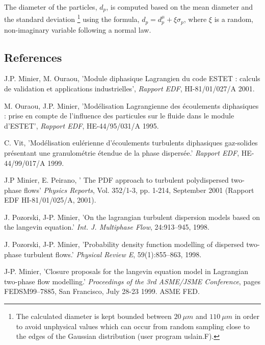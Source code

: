 \documentclass[a4paper,twoside,12pt]{article}
\begin{document}
\begin{itemize}
         \noindent
         The diameter of the particles, $d_p$, is computed based on the mean diameter and the standard deviation \footnote{The calculated diameter is kept bounded between  $20~\mu m$ and $110~\mu m$ in order to avoid unphysical values which can occur from random sampling close to the edges of the Gaussian distribution
            (user program uslain.F).} using the formula, $d_p = d_p^\mu + \xi \sigma_{p}$, where $\xi$ is a random, non-imaginary variable following a normal law.

\end{itemize}

\subsection{References}

\begin{thebibliography}{3}


    J.P. Minier, M. Ouraou, 'Module diphasique Lagrangien
   du code ESTET : calculs de validation et applications industrielles',
   {\it Rapport EDF}, HI-81/01/027/A 2001.

    M. Ouraou, J.P. Minier, 'Mod\'elisation Lagrangienne des
   \'ecoulements diphasiques : prise en compte de l'influence des particules
   sur le fluide dans le module d'ESTET',
   {\it Rapport EDF}, HE-44/95/031/A 1995.

     C. Vit, 'Mod\'elisation eul\'erienne d'\'ecoulements
   turbulents diphasiques gaz-solides pr\'esentant une granulom\'etrie
   \'etendue de la phase dispers\'ee.'
   {\it Rapport EDF}, HE-44/99/017/A 1999.

    J.P Minier, E. Peirano,
   ' The PDF approach to turbulent polydispersed two-phase flows'
   {\it Physics Reports}, Vol. 352/1-3, pp. 1-214, September 2001
   (Rapport EDF HI-81/01/025/A, 2001).

    J. Pozorski, J-P. Minier,
   'On the lagrangian turbulent dispersion models based on the langevin
   equation.'
   {\it Int. J. Multiphase Flow}, 24:913--945, 1998.

    J. Pozorski, J-P. Minier,
   'Probability density function modelling of dispersed two-phase
   turbulent flows.'
   {\it Physical Review E}, 59(1):855--863, 1998.

    J-P. Minier,
   'Closure proposals for the langevin equation model in {L}agrangian
   two-phase flow modelling.'
   {\it Proceedings of the 3rd ASME/JSME Conference}, pages
   FEDSM99--7885, San Francisco, July 28-23 1999. ASME FED.


\end{thebibliography}
\end{document}
